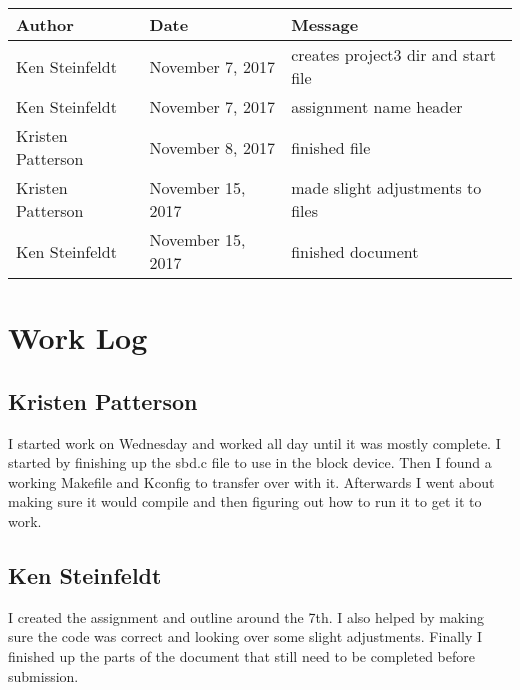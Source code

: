 \documentclass[10pt,letterpaper,onecolumn,draftclsnofoot]{IEEEtran}
\begin{document}
\begin{center}
	\begin{tabular}{|l|l|l|}
		\hline
		\textbf{Author} & \textbf{Date} & \textbf{Message} \\ \hline
		Ken Steinfeldt & November 7, 2017 & creates project3 dir and start file \\ \hline
		Ken Steinfeldt & November 7, 2017 & assignment name header \\ \hline
		Kristen Patterson & November 8, 2017 & finished file \\ \hline
		Kristen Patterson & November 15, 2017 & made slight adjustments to files \\ \hline
		Ken Steinfeldt & November 15, 2017 & finished document \\ \hline
	\end{tabular}
\end{center}

\section{Work Log}
\subsection{Kristen Patterson}
I started work on Wednesday and worked all day until it was mostly complete. 
I started by finishing up the sbd.c file to use in the block device.
Then I found a working Makefile and Kconfig to transfer over with it. 
Afterwards I went about making sure it would compile and then figuring out how to run it to get it to work.

\subsection{Ken Steinfeldt}
I created the assignment and outline around the 7th.
I also helped by making sure the code was correct and looking over some slight adjustments.
Finally I finished up the parts of the document that still need to be completed before submission.
\end{document}
